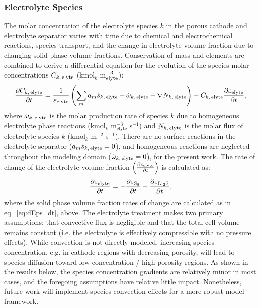 \documentclass{elsarticle}
\begin{document}
\subsubsection{Electrolyte Species}
The molar concentration of the electrolyte species $k$ in the porous cathode and electrolyte separator varies with time due to chemical and electrochemical reactions, species transport, and the change in electrolyte volume fraction due to changing solid phase volume fractions. Conservation of mass and elements are combined to derive a differential equation for the evolution of the species molar concentrations $C_{k,\,{\rm elyte}}$  (kmol$_k$ m$_{\rm elyte}^{-3}$):
\begin{equation}\label{eq:dCkelyte_dt}
    \frac{\partial C_{k,\,{\rm elyte}}}{\partial t} = \frac{1}{\varepsilon_{\rm elyte}}\left(\sum_m a_m\dot{s}_{k,\,{\rm elyte}} + \dot{\omega}_{k,\,{\rm elyte}} - \nabla N_{k,\,{\rm elyte}}\right) - C_{k,\,{\rm elyte}}\frac{\partial \varepsilon_{\rm elyte}}{\partial t},
\end{equation}
where $\dot{\omega}_{k,\,{\rm elyte}}$ is the molar production rate of species $k$ due to homogeneous electrolyte phase reactions (kmol$_k$ m$_\mathrm{elyte}^{-3}$ s$^{-1}$) and $N_{k,\,{\rm elyte}}$ is the molar flux of electrolyte species $k$ (kmol$_k$ m$^{-2}$ s$^{-1}$). There are no surface reactions in the electrolyte separator ($a_m\dot{s}_{k,\,{\rm elyte}} = 0$), and homogeneous reactions are neglected throughout the modeling domain ($\dot{\omega}_{k,\,{\rm elyte}}=0$), for the present work. The rate of change of the electrolyte volume fraction $\left(\frac{\partial \varepsilon_{\rm elyte}}{\partial t}\right)$ is calculated as:
\begin{equation}\label{eq:dEpsElyte_dt}
    \frac{\partial \varepsilon_{\rm elyte}}{\partial t} = -\frac{\partial \varepsilon_{\rm S_8}}{\partial t} -\frac{\partial \varepsilon_{\rm Li_2S}}{\partial t},
\end{equation}
where the solid phase volume fraction rates of change are calculated as in eq.~\ref{eq:dEps_dt}, above. The electrolyte treatment makes two primary assumptions: that convective flux is negligible and that the total cell volume remains constant (i.e. the electrolyte is effectively compressible with no pressure effects). While convection is not directly modeled, increasing species concentration, e.g. in cathode regions with decreasing porosity, will lead to species diffusion toward low concentration / high porosity regions.  As shown in the results below, the species concentration gradients are relatively minor in most cases, and the foregoing assumptions have relative little impact.  Nonetheless, future work will implement species convection effects for a more robust model framework.
\end{document}
